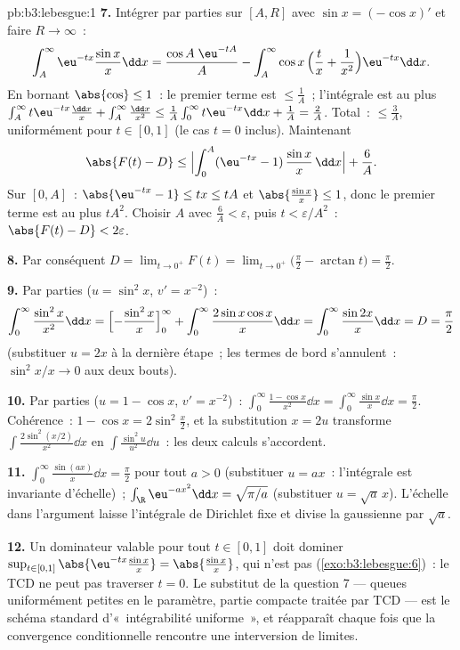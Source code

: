 \begin{solution}{pb:b3:lebesgue:1}
\textbf{7.} Intégrer par parties sur $[A, R]$ avec $\sin x
= (-\cos x)'$ et faire $R \to \infty$~:
\[
\int_A^{\infty}\eu^{-tx}\frac{\sin x}x\dd x
= \frac{\cos A\;\eu^{-tA}}{A}
- \int_A^\infty \cos x\,\Bigl(\frac tx +
\frac1{x^2}\Bigr)\eu^{-tx}\dd x .
\]
En bornant $\abs{\cos} \leq 1$~: le premier terme est $\leq
\frac1A$~; l'intégrale est au plus $\int_A^\infty
t\eu^{-tx}\frac{\dd x}x + \int_A^\infty\frac{\dd x}{x^2}
\leq \frac1A\int_0^\infty t\eu^{-tx}\dd x + \frac1A =
\frac2A$. Total~: $\leq \frac 3A$, uniformément pour $t
\in [0, 1]$ (le cas $t = 0$ inclus). Maintenant
\[
\abs{F(t) - D} \leq
\Bigl|\int_0^A(\eu^{-tx} - 1)\,\frac{\sin x}x\,\dd x\Bigr| +
\frac6A .
\]
Sur $[0, A]$~: $\abs{\eu^{-tx} - 1} \leq tx \leq tA$ et
$\abs{\frac{\sin x}x} \leq 1$, donc le premier terme est au
plus $tA^2$. Choisir $A$ avec $\frac6A < \varepsilon$,
puis $t < \varepsilon/A^2$~: $\abs{F(t) - D} <
2\varepsilon$.

\textbf{8.} Par conséquent $D = \lim_{t\to0^+}F(t) =
\lim_{t\to0^+}\bigl(\frac\pi2 - \arctan t\bigr) =
\frac\pi2$.

\textbf{9.} Par parties ($u = \sin^2x$, $v' = x^{-2}$)~:
\[
\int_0^\infty\frac{\sin^2x}{x^2}\dd x
= \Bigl[-\frac{\sin^2x}{x}\Bigr]_0^\infty +
\int_0^\infty\frac{2\sin x\cos x}{x}\dd x
= \int_0^\infty\frac{\sin 2x}{x}\dd x = D = \frac\pi2
\]
(substituer $u = 2x$ à la dernière étape~; les termes de
bord s'annulent~: $\sin^2 x/x \to 0$ aux deux bouts).

\textbf{10.} Par parties ($u = 1 - \cos x$, $v' =
x^{-2}$)~: $\int_0^\infty\frac{1 - \cos x}{x^2}\dd x =
\int_0^\infty\frac{\sin x}x\dd x = \frac\pi2$. Cohérence~:
$1 - \cos x = 2\sin^2\frac x2$, et la substitution $x =
2u$ transforme $\int\frac{2\sin^2(x/2)}{x^2}\dd x$ en
$\int\frac{\sin^2u}{u^2}\dd u$~: les deux calculs
s'accordent.

\textbf{11.} $\int_0^\infty\frac{\sin(ax)}x\dd x =
\frac\pi2$ pour tout $a > 0$ (substituer $u = ax$~:
l'intégrale est invariante d'échelle)~;
$\int_\R\eu^{-ax^2}\dd x = \sqrt{\pi/a}$ (substituer $u =
\sqrt a\,x$). L'échelle dans l'argument laisse l'intégrale
de Dirichlet fixe et divise la gaussienne par $\sqrt a$.

\textbf{12.} Un dominateur valable pour tout $t \in [0,1]$
doit dominer $\sup_{t\in[0,1]}\abs{\eu^{-tx}\frac{\sin
x}x} = \abs{\frac{\sin x}x}$, qui n'est pas 
(\cref{exo:b3:lebesgue:6})~: le TCD ne peut pas traverser $t
= 0$. Le substitut de la question 7 --- queues
uniformément petites en le paramètre, partie compacte
traitée par TCD --- est le schéma standard
d'«~intégrabilité uniforme~», et réapparaît chaque fois
que la convergence conditionnelle rencontre une
interversion de limites.


\end{solution}
